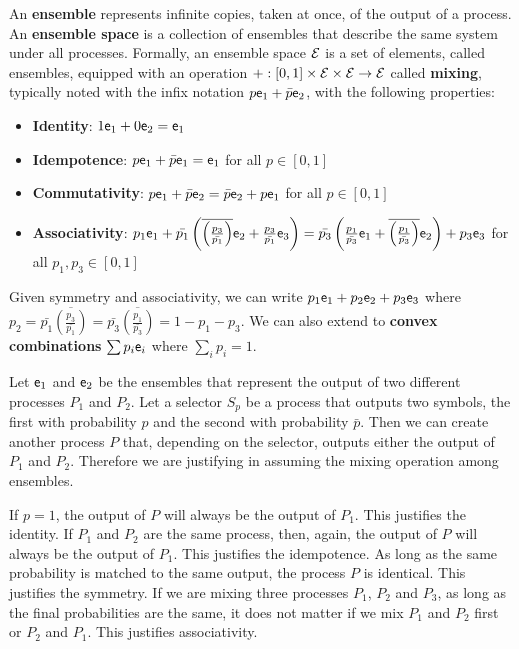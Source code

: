 \begin{defn}
	An \textbf{ensemble} represents infinite copies, taken at once, of the output of a process. An \textbf{ensemble space} is a collection of ensembles that describe the same system under all processes. Formally, an ensemble space $\mathcal{E}$ is a set of elements, called ensembles, equipped with an operation $+ : [0, 1] \times \mathcal{E} \times \mathcal{E} \to \mathcal{E}$ called \textbf{mixing}, typically noted with the infix notation $p \mathsf{e}_1 + \bar{p} \mathsf{e}_2$, with the following properties:
	\begin{itemize}
		\item \textbf{Identity}: $1 \mathsf{e}_1 + 0 \mathsf{e}_2 = \mathsf{e}_1$
		\item \textbf{Idempotence}:  $p \mathsf{e}_1 + \bar{p} \mathsf{e}_1 = \mathsf{e}_1$ for all $p \in [0,1]$
		\item \textbf{Commutativity}: $p \mathsf{e}_1 + \bar{p} \mathsf{e}_2 = \bar{p} \mathsf{e}_2 + p \mathsf{e}_1$ for all $p \in [0,1]$
		\item \textbf{Associativity}: $p_1 \mathsf{e}_1 + \bar{p_1}\left(\overline{\left(\frac{p_3}{\bar{p_1}}\right)}\mathsf{e}_2 + \frac{p_3}{\bar{p_1}}\mathsf{e}_3\right) =  \bar{p_3}\left(\frac{p_1}{\bar{p_3}} \mathsf{e}_1 +  \overline{\left(\frac{p_1}{\bar{p_3}}\right)}\mathsf{e}_2\right) + p_3 \mathsf{e}_3$ for all $p_1, p_3 \in [0,1]$
	\end{itemize}
	Given symmetry and associativity, we can write $p_1 \mathsf{e}_1 + p_2 \mathsf{e}_2 + p_3 \mathsf{e}_3$ where $p_2 = \bar{p_1}\overline{\left(\frac{p_3}{\bar{p_1}}\right)} = \bar{p_3}\overline{\left(\frac{p_1}{\bar{p_3}}\right)} = 1 - p_1 - p_3$. We can also extend to \textbf{convex combinations} $\sum p_i \mathsf{e}_i$ where $\sum_i p_i = 1$.
\end{defn}
\begin{justification}
	Let $\mathsf{e}_1$ and $\mathsf{e}_2$ be the ensembles that represent the output of two different processes $P_1$ and $P_2$. Let a selector $S_p$ be a process that outputs two symbols, the first with probability $p$ and the second with probability $\bar{p}$. Then we can create another process $P$ that, depending on the selector, outputs either the output of $P_1$ and $P_2$. Therefore we are justifying in assuming the mixing operation among ensembles.
	
	If $p=1$, the output of $P$ will always be the output of $P_1$. This justifies the identity. If $P_1$ and $P_2$ are the same process, then, again, the output of $P$ will always be the output of $P_1$. This justifies the idempotence. As long as the same probability is matched to the same output, the process $P$ is identical. This justifies the symmetry. If we are mixing three processes $P_1$, $P_2$ and $P_3$, as long as the final probabilities are the same, it does not matter if we mix $P_1$ and $P_2$ first or $P_2$ and $P_1$. This justifies associativity.
\end{justification}


